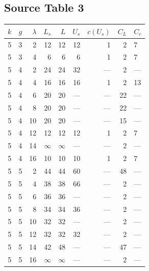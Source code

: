 \subsection*{Source Table 3}
\begin{longtable}{rrrrrrrrl}
\toprule $k$ & $g$ & $\lambda$ & $L_s$ & $L$ & $U_s$ & $c(U_s)$ & $C_L$ & $C_c$ \\ \midrule\endhead
5 & 3 & 2 & 12 & 12 & 12 & 1 & 2 & 7 \\
5 & 3 & 4 & 6 & 6 & 6 & 1 & 2 & 7 \\
5 & 4 & 2 & 24 & 24 & 32 & --- & 2 & --- \\
5 & 4 & 4 & 16 & 16 & 16 & 1 & 2 & 13 \\
5 & 4 & 6 & 20 & 20 & --- & --- & 22 & --- \\
5 & 4 & 8 & 20 & 20 & --- & --- & 22 & --- \\
5 & 4 & 10 & 20 & 20 & --- & --- & 15 & --- \\
5 & 4 & 12 & 12 & 12 & 12 & 1 & 2 & 7 \\
5 & 4 & 14 & $\infty$ & $\infty$ & --- & --- & 2 & --- \\
5 & 4 & 16 & 10 & 10 & 10 & 1 & 2 & 7 \\
5 & 5 & 2 & 44 & 44 & 60 & --- & 48 & --- \\
5 & 5 & 4 & 38 & 38 & 66 & --- & 2 & --- \\
5 & 5 & 6 & 36 & 36 & --- & --- & 2 & --- \\
5 & 5 & 8 & 34 & 34 & 36 & --- & 2 & --- \\
5 & 5 & 10 & 32 & 32 & --- & --- & 2 & --- \\
5 & 5 & 12 & 32 & 32 & 32 & --- & 2 & --- \\
5 & 5 & 14 & 42 & 48 & --- & --- & 47 & --- \\
5 & 5 & 16 & $\infty$ & $\infty$ & --- & --- & 2 & --- \\
\bottomrule\end{longtable}

